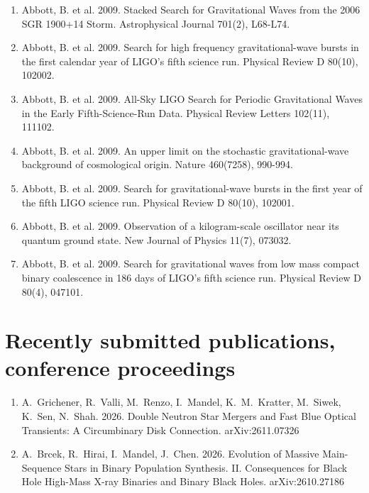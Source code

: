 \documentclass[margin,line]{res}
\begin{document}
\begin{resume}
\begin{enumerate}
\item Abbott, B. et al. 2009. Stacked Search for Gravitational Waves from the 2006 SGR 1900+14 Storm. Astrophysical Journal 701(2), L68-L74. 

\item Abbott, B. et al. 2009. Search for high frequency gravitational-wave bursts in the first calendar year of LIGO's fifth science run. Physical Review D 80(10),  102002. 

\item Abbott, B. et al. 2009. All-Sky LIGO Search for Periodic Gravitational Waves in the Early Fifth-Science-Run Data. Physical Review Letters 102(11), 111102. 

\item Abbott, B. et al. 2009. An upper limit on the stochastic gravitational-wave background of cosmological origin. Nature 460(7258), 990-994. 

\item Abbott, B. et al. 2009. Search for gravitational-wave bursts in the first year of the fifth LIGO science run. Physical Review D 80(10), 102001. 

\item Abbott, B. et al. 2009. Observation of a kilogram-scale oscillator near its quantum ground state. New Journal of Physics 11(7), 073032.

\item Abbott, B. et al. 2009. Search for gravitational waves from low mass compact binary coalescence in 186 days of LIGO's fifth science run. Physical Review D 80(4), 047101. 

\end{enumerate}

\section{\sc Recently submitted publications, conference proceedings}

\begin{enumerate}

\item A.~Grichener, R.~Valli, M.~Renzo, I.~Mandel, K.~M.~Kratter, M.~Siwek, K.~Sen, N.~Shah.  2026. Double Neutron Star Mergers and Fast Blue Optical Transients: A Circumbinary Disk Connection.  arXiv:2611.07326 

\item A.~Brcek, R.~Hirai, I.~Mandel, J.~Chen.  2026. Evolution of Massive Main-Sequence Stars in Binary Population Synthesis. II. Consequences for Black Hole High-Mass X-ray Binaries and Binary Black Holes.  arXiv:2610.27186


\end{enumerate}
\end{resume}
\end{document}
